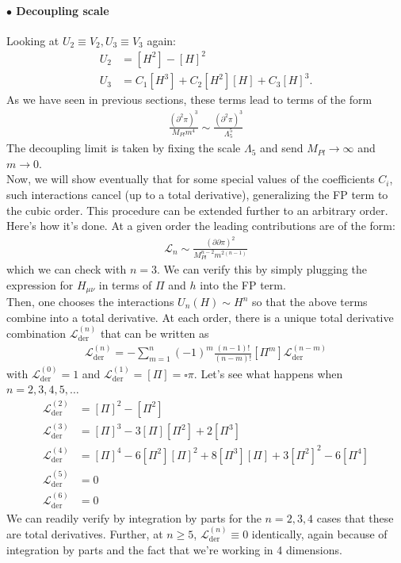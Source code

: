 \documentclass{book}
\theoremstyle{definition}
\newcommand{\p}{\partial}
\newcommand{\lag}{\mathcal{L}}
\newcommand{\f}[2]{\frac{#1}{#2}}
\begin{document}
\paragraph{$\bullet$ Decoupling scale}

Looking at $U_2\equiv V_2, U_3\equiv V_3$ again:
\begin{align}
U_2 &= [H^2]  - [H]^2\\
U_3 &= C_1 [H^3] + C_2 [H^2][H] + C_3 [H]^3.
\end{align}
As we have seen in previous sections, these terms lead to terms of the form
\begin{align}
\f{(\p^2 \pi)^3}{ M_{Pl}m^4} \sim \f{(\p^2 \pi)^3}{\Lambda_5^5}
\end{align}
The decoupling limit is taken by fixing the scale $\Lambda_5$ and send $M_{Pl} \to \infty$ and $m \to 0$. \\

Now, we will show eventually that for some special values of the coefficients $C_i$, such interactions cancel (up to a total derivative), generalizing the FP term to the cubic order. This procedure can be extended further to an arbitrary order. \\

Here's how it's done. At a given order the leading contributions are of the form:
\begin{align}\label{leading}
\lag_n \sim \f{(\p \p \pi)^2}{M_{Pl}^{n-2} m^{2(n-1)}}
\end{align}
which we can check with $n=3$. We can verify this by simply plugging the expression for $H_{\mu\nu}$ in terms of $\Pi$ and $h$ into the FP term.\\

Then, one chooses the interactions $U_n(H) \sim H^n$ so that the above terms combine into a total derivative. At each order, there is a unique total derivative combination $\lag^{(n)}_\text{der}$ that can be written as
\begin{align}\label{tot}
\lag^{(n)}_\text{der} = -\sum^n_{m=1}(-1)^m \f{(n-1)!}{(n-m)!}[\Pi^m] \lag^{(n-m)}_\text{der}
\end{align}
with $\lag^{(0)}_\text{der} = 1$ and $\lag^{(1)}_\text{der} = [\Pi] = \square \pi$. Let's see what happens when $n=2,3,4,5,\dots$
\begin{align}
\lag^{(2)}_\text{der} &= [\Pi]^2 - [\Pi^2]\\
\lag^{(3)}_\text{der} &= [\Pi]^3 - 3[\Pi][\Pi^2] + 2[\Pi^3]\\
\lag^{(4)}_\text{der} &= [\Pi]^4 - 6[\Pi^2][\Pi]^2 + 8[\Pi^3][\Pi] + 3[\Pi^2]^2 - 6[\Pi^4]\\
\lag^{(5)}_\text{der} &= 0\\
\lag^{(6)}_\text{der} &= 0
\end{align}
We can readily verify by integration by parts for the $n=2,3,4$ cases that these are total derivatives. Further, at $n\geq 5$, $\lag^{(n)}_\text{der} \equiv 0$ identically, again because of integration by parts and the fact that we're working in 4 dimensions.\\
\end{document}
